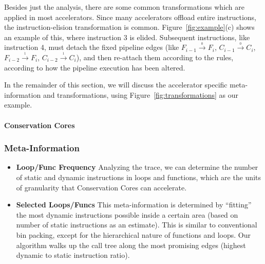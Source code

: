 Besides just the analysis, there are some common transformations which are applied
in most accelerators.
Since many accelerators offload entire instructions, the instruction-elision
 transformation is common.
Figure~\ref{fig:example}(c) shows an example of this, where instruction 3 is elided.
Subsequent instructions, like instruction 4, must detach the fixed pipeline edges
(like $F_{i-1} \xrightarrow{_0} F_{i}$, $C_{i-1} \xrightarrow{_0} C_{i}$,
$F_{i-2} \xrightarrow{_1} F_{i}$, $C_{i-2} \xrightarrow{_1} C_{i}$), and then re-attach
them according to the rules, according to how the pipeline execution has been altered. 

In the remainder of this section, we will discuss the accelerator specific 
meta-information and transformations, using Figure~\ref{fig:transformations} as our
example.

\paragraph{Conservation Cores}

\subsubsection*{Meta-Information}
\begin{itemize}
  \item \textbf{Loop/Func Frequency} Analyzing the trace, we can determine the number of 
  static and dynamic instructions in loops and functions, which are the units of 
  granularity that Conservation Cores can accelerate.
  \item \textbf{Selected Loops/Funcs} This meta-information is determined by
``fitting'' the most dynamic instructions possible inside a certain area (based on
number of static instructions as an estimate).  This is similar to conventional
bin packing, except for the hierarchical nature of functions and loops.  Our
algorithm walks up the call tree along the most promising edges 
(highest dynamic to static instruction ratio).
\end{itemize}

